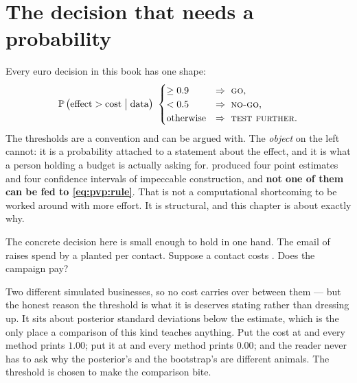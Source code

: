\section{The decision that needs a probability}
\label{sec:pvp:decision}

Every euro decision in this book has one shape:
%
\begin{equation}
  \operatorname{\mathbb{P}}\big(\text{effect} > \text{cost} \;\big|\; \text{data}\big)\ \begin{cases}
    \ge 0.9 & \Rightarrow\ \textsc{go},\\
    < 0.5   & \Rightarrow\ \textsc{no-go},\\
    \text{otherwise} & \Rightarrow\ \textsc{test further}.
  \end{cases}
  \label{eq:pvp:rule}
\end{equation}
%
The thresholds are a convention and can be argued with. The \emph{object} on the left cannot:
it is a probability attached to a statement about the effect, and it is what a person holding a
budget is actually asking for.  produced four point estimates and four confidence
intervals of impeccable construction, and \textbf{not one of them can be fed to
\cref{eq:pvp:rule}}. That is not a computational shortcoming to be worked around with more
effort. It is structural, and this chapter is about exactly why.

The concrete decision here is small enough to hold in one hand. The email of  raises
spend by a planted \eur{\nbZeroTrueDag} per contact. Suppose a contact costs
\eur{\nbZeroContactCost}. Does the campaign pay?

\begin{remark}
Two different simulated businesses, so no cost carries over between them --- but the honest
reason the threshold is what it is deserves stating rather than dressing up. It sits about
\nbZeroCostInSds{} posterior standard deviations below the estimate, which is the only place a
comparison of this kind teaches anything. Put the cost at  and every method prints
$1.00$; put it at  and every method prints $0.00$; and the reader never has to ask why
the posterior's \nbZeroPPays{} and the bootstrap's \nbZeroBootShare{} are different animals.
The threshold is chosen to make the comparison bite.
\end{remark}

